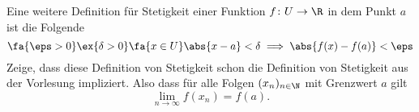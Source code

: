 \begin{exercise}
  Eine weitere Definition für Stetigkeit einer Funktion $f \colon U \to \R$ in
  dem Punkt $a$ ist die Folgende
  \begin{equation*}
    \fa{\eps > 0} \ex{\delta > 0} \fa{x \in U} \abs{x - a} < \delta \implies
    \abs{f(x) - f(a)} < \eps
  \end{equation*}
  Zeige, dass diese Definition von Stetigkeit schon die Definition von
  Stetigkeit aus der Vorlesung impliziert. Also dass für alle Folgen
  $(x_n)_{n \in \N}$ mit Grenzwert $a$ gilt
  \begin{equation*}
    \lim_{n \to \infty} f(x_n)
    =
    f(a).
  \end{equation*}

\end{exercise}
